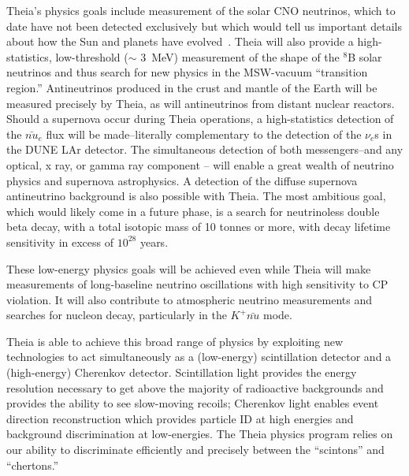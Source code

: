 	Theia's physics goals include measurement of the solar CNO neutrinos,
which to date have not been detected exclusively but which would tell us
important details about how the Sun and planets have evolved~\cite{haxton}.
Theia will also provide a high-statistics, low-threshold ($\sim$ 3~MeV)
measurement of the shape of the $^8$B solar neutrinos and thus search for new
physics in the MSW-vacuum ``transition region.'' Antineutrinos produced in the
crust and mantle of the Earth will be measured precisely by Theia, as will
antineutrinos from distant nuclear reactors. Should a supernova occur during
Theia operations, a high-statistics detection of the $\bar{nu}_e$ flux will be
made--literally complementary to the  detection of the $\nu_e$s in the DUNE LAr
detector. The simultaneous detection of both messengers--and any optical, x
ray, or gamma ray component -- will enable a great wealth of neutrino physics
and supernova astrophysics. A detection of the diffuse supernova antineutrino
background is also possible with Theia.  The most ambitious goal,
which would likely come in a future phase, is a search for neutrinoless double
beta decay, with a total isotopic mass of 10 tonnes or more, with decay
lifetime sensitivity in excess of $10^{28}$ years.

These low-energy physics goals will be achieved even while Theia will make
measurements of long-baseline neutrino oscillations with high sensitivity to CP
violation. It will also contribute to atmospheric neutrino measurements and
searches for nucleon decay, particularly in the $K^+\bar{nu}$ mode.

Theia is able to achieve this broad range of physics by exploiting new
technologies to act simultaneously as a (low-energy) scintillation detector and
a (high-energy) Cherenkov detector. Scintillation light provides the energy
resolution necessary to get above the majority of radioactive backgrounds and
provides the ability to see slow-moving recoils; Cherenkov light enables event
direction reconstruction which provides particle ID at high energies and
background discrimination at low-energies. The Theia physics program relies on
our ability to discriminate efficiently and precisely between the ``scintons''
and ``chertons.'' 

